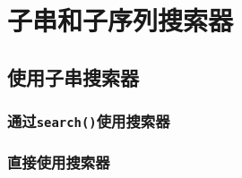 \section{子串和子序列搜索器}\label{ch24}
\subsection{使用子串搜索器}
\subsubsection{通过\texttt{search()}使用搜索器}
\subsubsection{直接使用搜索器}\label{ch24.1.2}